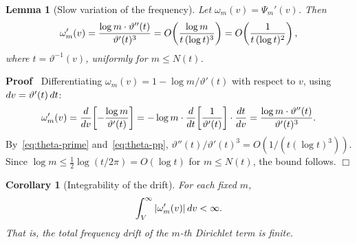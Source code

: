 \documentclass{article}
\newenvironment{proof}{\noindent\textbf{Proof\ }}{\hspace*{\fill}$\Box$\medskip}
\newtheorem{corollary}{Corollary}
\newtheorem{lemma}{Lemma}
\begin{document}
\begin{lemma}
  [Slow variation of the frequency]\label{lem:freq-drift} Let $\omega_m (v) =
  \Psi_m' (v)$. Then
  \begin{equation}
    \label{eq:freq-drift-rate} \omega_m' (v) = \frac{\log m \cdot \vartheta''
    (t)}{\vartheta' (t)^3} = O \hspace{-0.17em} \left( \frac{\log m}{t
    \hspace{0.17em} (\log t)^3} \right) = O \hspace{-0.17em} \left( \frac{1}{t
    \hspace{0.17em} (\log t)^2} \right),
  \end{equation}
  where $t = \vartheta^{- 1} (v)$, uniformly for $m \le N (t)$.
\end{lemma}

\begin{proof}
  Differentiating $\omega_m (v) = 1 - \log m / \vartheta' (t)$ with respect to
  $v$, using $dv = \vartheta' (t)  \hspace{0.17em} dt$:
  \[ \omega_m' (v) = \frac{d}{dv}  \hspace{-0.17em} \left[ - \frac{\log
     m}{\vartheta' (t)} \right] = - \log m \cdot \frac{d}{dt} \hspace{-0.17em}
     \left[ \frac{1}{\vartheta' (t)} \right] \cdot \frac{dt}{dv} = \frac{\log
     m \cdot \vartheta'' (t)}{\vartheta' (t)^3} . \]
  By~\eqref{eq:theta-prime} and~\eqref{eq:theta-pp}, $\vartheta'' (t) /
  \vartheta' (t)^3 = O (1 / (t (\log t)^3))$. Since $\log m \le \tfrac{1}{2}
  \log (t / 2 \pi) = O (\log t)$ for $m \le N (t)$, the bound follows.
\end{proof}

\begin{corollary}
  [Integrability of the drift]\label{cor:drift-int} For each fixed $m$,
  \[ \int_V^{\infty} | \omega_m' (v) |  \hspace{0.17em} dv < \infty . \]
  That is, the total frequency drift of the $m$-th Dirichlet term is finite.
\end{corollary}
\end{document}
